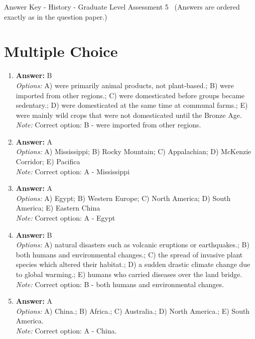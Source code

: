 \documentclass[12pt]{article}
\begin{document}
\begin{center}
Answer Key - History - Graduate Level Assessment 5 \
\small (Answers are ordered exactly as in the question paper.)
\end{center}

\section*{Multiple Choice}
\begin{enumerate}[label=\arabic*.]
\item \textbf{Answer:} B
\\ \textit{Options:} A) were primarily animal products, not plant-based.; B) were imported from other regions.; C) were domesticated before groups became sedentary.; D) were domesticated at the same time at communal farms.; E) were mainly wild crops that were not domesticated until the Bronze Age.
\\ \textit{Note:} Correct option: B - were imported from other regions.
\item \textbf{Answer:} A
\\ \textit{Options:} A) Mississippi; B) Rocky Mountain; C) Appalachian; D) McKenzie Corridor; E) Pacifica
\\ \textit{Note:} Correct option: A - Mississippi
\item \textbf{Answer:} A
\\ \textit{Options:} A) Egypt; B) Western Europe; C) North America; D) South America; E) Eastern China
\\ \textit{Note:} Correct option: A - Egypt
\item \textbf{Answer:} B
\\ \textit{Options:} A) natural disasters such as volcanic eruptions or earthquakes.; B) both humans and environmental changes.; C) the spread of invasive plant species which altered their habitat.; D) a sudden drastic climate change due to global warming.; E) humans who carried diseases over the land bridge.
\\ \textit{Note:} Correct option: B - both humans and environmental changes.
\item \textbf{Answer:} A
\\ \textit{Options:} A) China.; B) Africa.; C) Australia.; D) North America.; E) South America.
\\ \textit{Note:} Correct option: A - China.
\end{enumerate}
\end{document}
